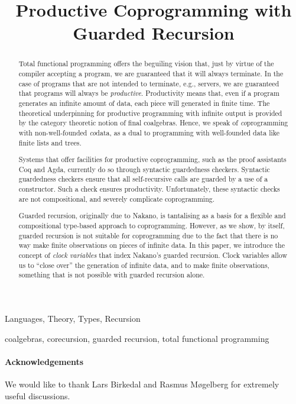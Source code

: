 \documentclass[natbib,preprint]{sigplanconf}
\title{Productive Coprogramming with Guarded Recursion}
\begin{document}
\maketitle

\begin{abstract}
  Total functional programming offers the beguiling vision that, just
  by virtue of the compiler accepting a program, we are guaranteed
  that it will always terminate. In the case of programs that are not
  intended to terminate, e.g., servers, we are guaranteed that
  programs will always be \emph{productive}. Productivity means that,
  even if a program generates an infinite amount of data, each piece
  will generated in finite time. The theoretical underpinning for
  productive programming with infinite output is provided by the
  category theoretic notion of final coalgebras. Hence, we speak of
  \emph{co}programming with non-well-founded \emph{co}data, as a dual
  to programming with well-founded data like finite lists and trees.

  Systems that offer facilities for productive coprogramming, such as
  the proof assistants Coq and Agda, currently do so through syntactic
  guardedness checkers. Syntactic guardedness checkers ensure that all
  self-recursive calls are guarded by a use of a constructor. Such a
  check ensures productivity. Unfortunately, these syntactic checks
  are not compositional, and severely complicate coprogramming.

  Guarded recursion, originally due to Nakano, is tantalising as a
  basis for a flexible and compositional type-based approach to
  coprogramming. However, as we show, by itself, guarded recursion is
  not suitable for coprogramming due to the fact that there is no way
  make finite observations on pieces of infinite data. In this paper,
  we introduce the concept of \emph{clock variables} that index
  Nakano's guarded recursion. Clock variables allow us to ``close
  over'' the generation of infinite data, and to make finite
  observations, something that is not possible with guarded recursion
  alone.
\end{abstract}

  

\terms
  Languages, Theory, Types, Recursion

\keywords
  coalgebras, corecursion, guarded recursion, total functional programming







\paragraph{Acknowledgements} We would like to thank Lars Birkedal and
Rasmus M{\o}gelberg for extremely useful discussions.




%
\end{document}

